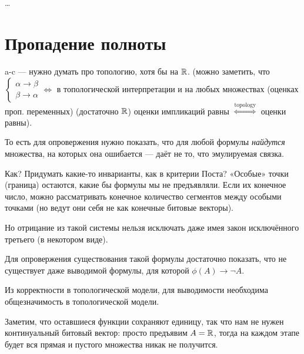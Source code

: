 \documentclass[12pt, a4paper]{article}
\begin{document}
\section{}

…

\section{Пропадение полноты}


a-c — нужно думать про топологию, хотя бы на ${\mathbb{R}}$.
(можно заметить, что $\begin{cases}
    \alpha → \beta \\
    \beta → \alpha
\end{cases} \Leftrightarrow$ в топологической интерпретации
и на любых множествах (оценках проп. переменных) (достаточно ${\mathbb{R}}$) оценки импликаций равны $\overset{\text{topology}}{\Longleftrightarrow}$ оценки равны).

То есть для опровержения нужно показать, что для любой формулы \textit{найдутся} множества,
на которых она ошибается — даёт не то, что эмулируемая связка.


Как? Придумать какие-то инварианты, как в критерии Поста?
«Особые» точки (граница) остаются, какие бы формулы мы не предъявляли.
Если их конечное число, можно рассматривать
конечное количество сегментов между особыми точками
(но ведут они себя не как конечные битовые векторы).

\ornamentbreak

Но отрицание из такой системы нельзя исключать даже имея закон исключённого третьего (в некотором виде).

Для опровержения существования такой формулы достаточно показать,
что не существует даже выводимой формулы, для которой $\phi(A) → \neg A$.

Из корректности в топологической модели, для выводимости 
необходима общезначимость в топологической модели.

Заметим, что оставшиеся функции сохраняют единицу, так что нам не нужен континуальный битовый вектор:
просто предъявим $A = {\mathbb{R}}$, тогда на каждом этапе будет вся прямая и пустого множества никак не получится.
\end{document}
